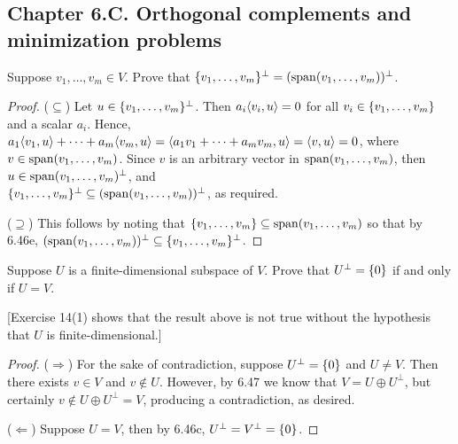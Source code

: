 \subsection*{Chapter 6.C. Orthogonal complements and minimization problems}


\begin{exercise}{1}
  Suppose $v_1,\dots,v_m\in V$. Prove that $\{v_1,\dots,v_m\}^\perp =(\operatorname*{span}(v_1,\dots,v_m))^\perp$.
\end{exercise}
\begin{proof}
 ($\subseteq$) Let $u\in\{v_1,\dots,v_m\}^\perp$. Then $a_i\langle v_i,u\rangle=0$ for all $v_i\in\{v_1,\dots,v_m\}$ and a scalar $a_i$. Hence, $a_1\langle v_1,u\rangle+\dots+a_m\langle v_m,u\rangle =\langle a_1v_1+\dots+a_mv_m,u\rangle =\langle v,u\rangle =0$, where $v\in\operatorname*{span}(v_1,\dots,v_m)$. Since $v$ is an arbitrary vector in $\operatorname*{span}(v_1,\dots,v_m)$, then $u\in\operatorname*{span}(v_1,\dots,v_m)^\perp$, and \\${\{v_1,\dots,v_m\}^\perp \subseteq(\operatorname*{span}(v_1,\dots,v_m))^\perp}$, as required.

 ($\supseteq$) This follows by noting that $\{v_1,\dots,v_m\}\subseteq\operatorname*{span}(v_1,\dots,v_m)$ so that by 6.46e, $(\operatorname*{span}(v_1,\dots,v_m))^\perp\subseteq\{v_1,\dots,v_m\}^\perp$.
\end{proof}

\begin{exercise}{2}
  Suppose $U$ is a finite-dimensional subspace of $V$. Prove that $U^\perp=\{0\}$ if and only if $U=V$.

  [Exercise 14(1) shows that the result above is not true without the hypothesis that $U$ is finite-dimensional.]
\end{exercise}
\begin{proof}
 ($\Rightarrow$) For the sake of contradiction, suppose $U^\perp=\{0\}$ and $U\neq V$. Then there exists $v\in V$ and $v\notin U$. However, by 6.47 we know that $V=U\oplus U^\perp$, but certainly $v\notin U\oplus U^\perp=V$, producing a contradiction, as desired.

 ($\Leftarrow$) Suppose $U=V$, then by 6.46c, $U^\perp=V^\perp=\{0\}$.
\end{proof}

